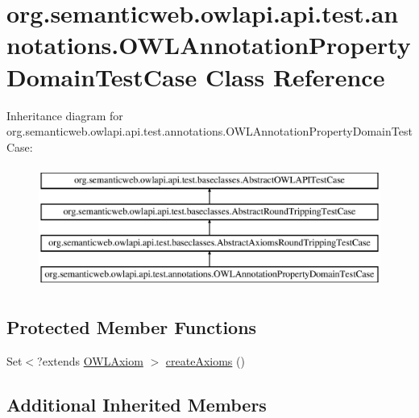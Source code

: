 \hypertarget{classorg_1_1semanticweb_1_1owlapi_1_1api_1_1test_1_1annotations_1_1_o_w_l_annotation_property_domain_test_case}{\section{org.\-semanticweb.\-owlapi.\-api.\-test.\-annotations.\-O\-W\-L\-Annotation\-Property\-Domain\-Test\-Case Class Reference}
\label{classorg_1_1semanticweb_1_1owlapi_1_1api_1_1test_1_1annotations_1_1_o_w_l_annotation_property_domain_test_case}
}
Inheritance diagram for org.\-semanticweb.\-owlapi.\-api.\-test.\-annotations.\-O\-W\-L\-Annotation\-Property\-Domain\-Test\-Case\-:\begin{figure}[H]
\begin{center}
\leavevmode
\includegraphics[height=4.000000cm]{classorg_1_1semanticweb_1_1owlapi_1_1api_1_1test_1_1annotations_1_1_o_w_l_annotation_property_domain_test_case}
\end{center}
\end{figure}
\subsection*{Protected Member Functions}
\begin{DoxyCompactItemize}
\item 
Set$<$?extends \hyperlink{interfaceorg_1_1semanticweb_1_1owlapi_1_1model_1_1_o_w_l_axiom}{O\-W\-L\-Axiom} $>$ \hyperlink{classorg_1_1semanticweb_1_1owlapi_1_1api_1_1test_1_1annotations_1_1_o_w_l_annotation_property_domain_test_case_abcafbd0f508ab8c144e0f4ab48f6ce95}{create\-Axioms} ()
\end{DoxyCompactItemize}
\subsection*{Additional Inherited Members}


